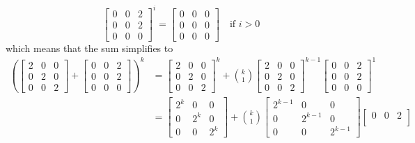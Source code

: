 \documentclass{article}
\begin{document}
\begin{equation*}
    \begin{bmatrix}
    0 & 0 & 2 \\
    0 & 0 & 2 \\
    0 & 0 & 0
   \end{bmatrix}^{i} = \begin{bmatrix}
    0 & 0 & 0 \\
    0 & 0 & 0 \\
    0 & 0 & 0
   \end{bmatrix} \quad \text{if } i > 0
\end{equation*} 
which means that the sum simplifies to 
\begin{align*}
    \left(\begin{bmatrix}
    2 & 0 & 0 \\
    0 & 2 & 0 \\
    0 & 0 & 2
\end{bmatrix} + \begin{bmatrix}
    0 & 0 & 2 \\
    0 & 0 & 2 \\
    0 & 0 & 0
   \end{bmatrix}\right)^{k} &= \begin{bmatrix}
    2 & 0 & 0 \\
    0 & 2 & 0 \\
    0 & 0 & 2
\end{bmatrix}^{k} + \binom{k}{1}\begin{bmatrix}
    2 & 0 & 0 \\
    0 & 2 & 0 \\
    0 & 0 & 2
\end{bmatrix}^{k-1} \begin{bmatrix}
    0 & 0 & 2 \\
    0 & 0 & 2 \\
    0 & 0 & 0
   \end{bmatrix}^{1} \\
   &=\begin{bmatrix}
    2^{k} & 0 & 0 \\
    0 & 2^{k} & 0 \\
    0 & 0 & 2^{k}
\end{bmatrix} + \binom{k}{1}\begin{bmatrix}
    2^{k-1} & 0 & 0 \\
    0 & 2^{k-1} & 0 \\
    0 & 0 & 2^{k-1}
\end{bmatrix}\begin{bmatrix}
    0 & 0 & 2 \\

\end{bmatrix}
\end{align*}
\end{document}
